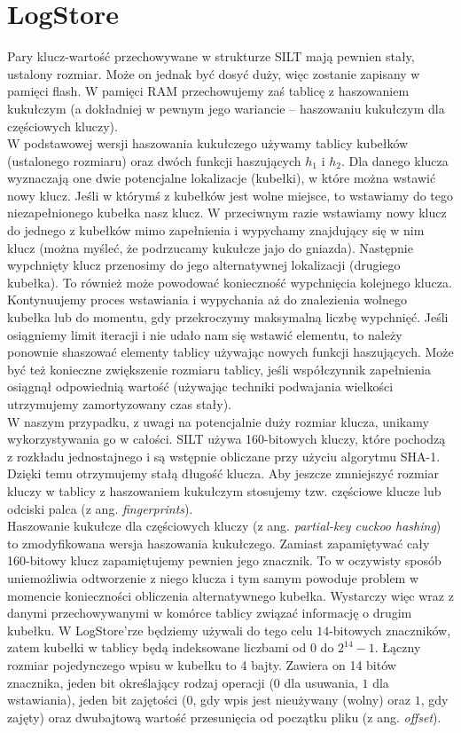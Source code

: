 \documentclass[declaration,shortabstract,masc]{iithesis}
\begin{document}
		\section{LogStore}
			Pary klucz-wartość przechowywane w strukturze SILT mają pewnien stały, ustalony rozmiar. Może on jednak być dosyć duży, więc zostanie zapisany w pamięci flash. W pamięci RAM przechowujemy zaś tablicę z haszowaniem kukułczym (a dokładniej w pewnym jego wariancie -- haszowaniu kukułczym dla częściowych kluczy).\\
			\indent W podstawowej wersji haszowania kukułczego używamy tablicy kubełków (ustalonego rozmiaru) oraz dwóch funkcji haszujących $h_1$ i $h_2$. Dla danego klucza wyznaczają one dwie potencjalne lokalizacje (kubełki), w które można wstawić nowy klucz. Jeśli w którymś z kubełków jest wolne miejsce, to wstawiamy do tego niezapełnionego kubełka nasz klucz. W przeciwnym razie wstawiamy nowy klucz do jednego z kubełków mimo zapełnienia i wypychamy znajdujący się w nim klucz (można myśleć, że podrzucamy kukułcze jajo do gniazda). Następnie wypchnięty klucz przenosimy do jego alternatywnej lokalizacji (drugiego kubełka). To również może powodować konieczność wypchnięcia kolejnego klucza. Kontynuujemy proces wstawiania i wypychania aż do znalezienia wolnego kubełka lub do momentu, gdy przekroczymy maksymalną liczbę wypchnięć. Jeśli osiągniemy limit iteracji i nie udało nam się wstawić elementu, to należy ponownie shaszować elementy tablicy używając nowych funkcji haszujących. Może być też konieczne zwiększenie rozmiaru tablicy, jeśli współczynnik zapełnienia osiągnął odpowiednią wartość (używając techniki podwajania wielkości utrzymujemy zamortyzowany czas stały).\\
			\indent W naszym przypadku, z uwagi na potencjalnie duży rozmiar klucza, unikamy wykorzystywania go w całości. SILT używa 160-bitowych kluczy, które pochodzą z rozkładu jednostajnego i są wstępnie obliczane przy użyciu algorytmu SHA-1. Dzięki temu otrzymujemy stałą długość klucza. Aby jeszcze zmniejszyć rozmiar kluczy w tablicy z haszowaniem kukułczym stosujemy tzw. częściowe klucze lub odciski palca (z ang. \textit{fingerprints}).\\
			\indent Haszowanie kukułcze dla częściowych kluczy (z ang. \textit{partial-key cuckoo hashing}) \cite{PKCH} to zmodyfikowana wersja haszowania kukułczego. Zamiast zapamiętywać cały 160-bitowy klucz zapamiętujemy pewnien jego znacznik. To w oczywisty sposób uniemożliwia odtworzenie z niego klucza i tym samym powoduje problem w momencie konieczności obliczenia alternatywnego kubełka. Wystarczy więc wraz z danymi przechowywanymi w komórce tablicy związać informację o drugim kubełku. W LogStore'rze będziemy używali do tego celu $14$-bitowych znaczników, zatem kubełki w tablicy będą indeksowane liczbami od $0$ do $2^{14} - 1$. Łączny rozmiar pojedynczego wpisu w kubełku to 4 bajty. Zawiera on 14 bitów znacznika, jeden bit określający rodzaj operacji ($0$ dla usuwania, $1$ dla wstawiania), jeden bit zajętości ($0$, gdy wpis jest nieużywany (wolny) oraz $1$, gdy zajęty) oraz dwubajtową wartość przesunięcia od początku pliku (z ang. \textit{offset}).\\
\end{document}
